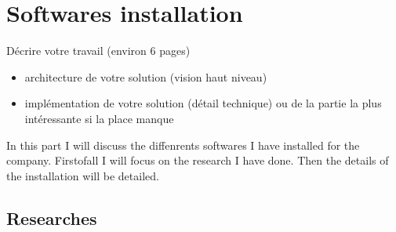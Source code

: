 
\section{Softwares installation}

Décrire votre travail (environ 6 pages)
\begin{itemize}
	\item architecture de votre solution (vision haut niveau)
	\item implémentation de votre solution (détail technique) ou de la partie la plus intéressante si la place manque

\end{itemize}

In this part I will discuss the diffenrents softwares I have installed for the company. Firstofall I will focus on the research I have done. Then the details of the installation will be detailed. 
\subsection{Researches}

